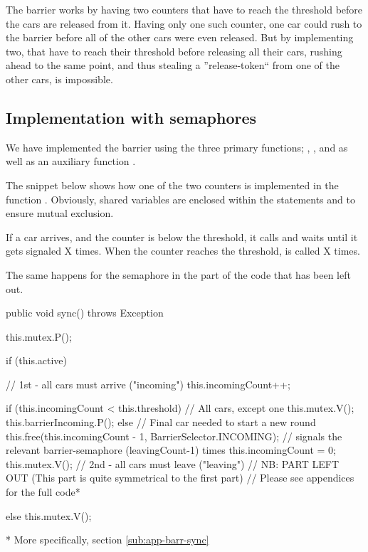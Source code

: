 

The barrier works by having two counters that have to reach the threshold before the cars are released from it. Having only one such counter, one car could rush to the barrier before all of the other cars were even released. But by implementing two, that have to reach their threshold before releasing all their cars, rushing ahead to the same point, and thus stealing a ''release-token`` from one of the other cars, is impossible.


\subsection{Implementation with semaphores}
\label{sub:bar-sema}
We have implemented the barrier using the three primary functions; , , and  as well as an auxiliary function .

The snippet below shows how one of the two counters is implemented in the function . Obviously, shared variables are enclosed within the statements  and  to ensure mutual exclusion.

If a car arrives, and the counter is below the threshold, it calls  and waits until it gets signaled X times. When the counter reaches the threshold,  is called X times.

The same happens for the semaphore  in the part of the code that has been left out.

\begin{java}
public void sync() throws Exception {
	this.mutex.P();

	if (this.active) {
		// 1st - all cars must arrive ("incoming")
		this.incomingCount++;

		if (this.incomingCount < this.threshold) { // All cars, except one
			this.mutex.V();
			this.barrierIncoming.P();
		} else { // Final car needed to start a new round
			this.free(this.incomingCount - 1, BarrierSelector.INCOMING);
			// signals the relevant barrier-semaphore (leavingCount-1) times
			this.incomingCount = 0;
			this.mutex.V();
		}
		// 2nd - all cars must leave ("leaving")
		// NB: PART LEFT OUT (This part is quite symmetrical to the first part)
		// Please see appendices for the full code*

	} else 
		this.mutex.V();
}
\end{java}
\begin{center}
* More specifically, section \ref{sub:app-barr-sync}
\end{center}



